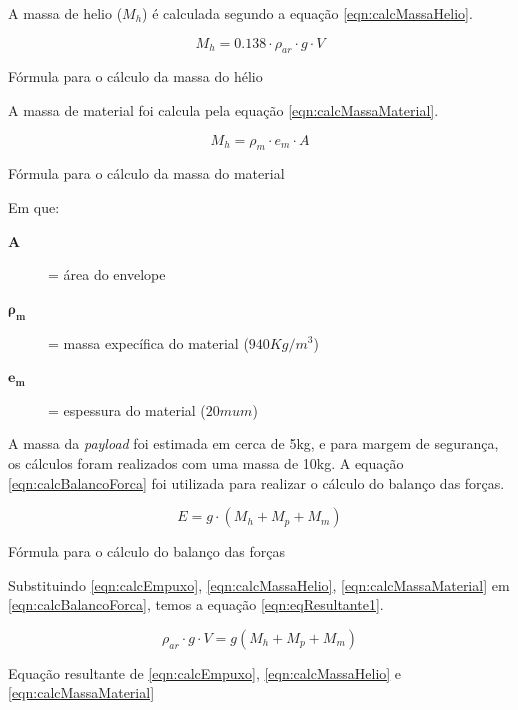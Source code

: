 	A massa de helio ($M_{h}$) é calculada segundo a equação \eqref{eqn:calcMassaHelio}.

	\begin{equacao}
		\begin{equation}
			M_{h} = 0.138 \cdot \rho_{ar} \cdot g \cdot V
		\end{equation}
		\caption{Fórmula para o cálculo da massa do hélio}
		\label{eqn:calcMassaHelio}
	\end{equacao}

	A massa de material foi calcula pela equação \eqref{eqn:calcMassaMaterial}.

	\begin{equacao}
		\begin{equation}
			M_{h} = \rho_{m} \cdot e_{m} \cdot A
		\end{equation}
		\caption{Fórmula para o cálculo da massa do material}
		\label{eqn:calcMassaMaterial}
	\end{equacao}

	Em que:
	\begin{description}
		\item[$\boldsymbol{A}$] = área do envelope
		\item[$\boldsymbol{\rho_{m}}$] = massa expecífica do material ($940Kg/m^3$)
		\item[$\boldsymbol{e_{m}}$] = espessura do material ($20mu m$)
	\end{description}

	A massa da \emph{payload} foi estimada em cerca de 5kg, e para margem de segurança, os cálculos foram realizados com uma massa de 10kg. A equação \eqref{eqn:calcBalancoForca} foi utilizada para realizar o cálculo do balanço das forças.

	\begin{equacao}
		\begin{equation}
			E = g \cdot (M_{h} + M_{p} + M_{m})
		\end{equation}
		\caption{Fórmula para o cálculo do balanço das forças}
		\label{eqn:calcBalancoForca}
	\end{equacao}

	Substituindo \eqref{eqn:calcEmpuxo}, \eqref{eqn:calcMassaHelio}, \eqref{eqn:calcMassaMaterial} em \eqref{eqn:calcBalancoForca}, temos a equação \eqref{eqn:eqResultante1}.

	\begin{equacao}
		\begin{equation}
			\rho_{ar} \cdot g \cdot V = g(M_{h} + M_{p} + M_{m})
		\end{equation}
		\caption{Equação resultante de \eqref{eqn:calcEmpuxo}, \eqref{eqn:calcMassaHelio} e \eqref{eqn:calcMassaMaterial}}
		\label{eqn:eqResultante1}
	\end{equacao}

